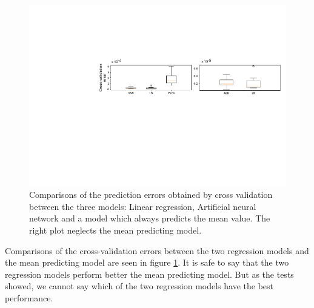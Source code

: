 \begin{figure}[H]
    \centering
    \includegraphics[width=\textwidth]{fig/RegressionEvaluationBoth.pdf}
    \caption{Comparisons of the prediction errors obtained by cross validation between the three models: Linear regression, Artificial neural network and a model which always predicts the mean value. The right plot neglects the mean predicting model.}
    \label{fig:cv_reg}
\end{figure}


Comparisons of the cross-validation errors between the two regression models and the mean predicting model are seen in figure \ref{fig:cv_reg}. It is safe to say that the two regression models perform better the mean predicting model. But as the tests showed, we cannot say which of the two regression models have the best performance.
